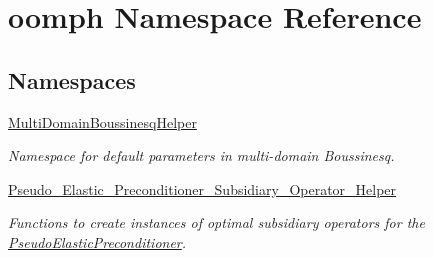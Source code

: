 \hypertarget{namespaceoomph}{}\section{oomph Namespace Reference}
\label{namespaceoomph}
\subsection*{Namespaces}
\begin{DoxyCompactItemize}
\item 
 \hyperlink{namespaceoomph_1_1MultiDomainBoussinesqHelper}{Multi\+Domain\+Boussinesq\+Helper}
\begin{DoxyCompactList}\small\item\em Namespace for default parameters in multi-\/domain Boussinesq. \end{DoxyCompactList}\item 
 \hyperlink{namespaceoomph_1_1Pseudo__Elastic__Preconditioner__Subsidiary__Operator__Helper}{Pseudo\+\_\+\+Elastic\+\_\+\+Preconditioner\+\_\+\+Subsidiary\+\_\+\+Operator\+\_\+\+Helper}
\begin{DoxyCompactList}\small\item\em Functions to create instances of optimal subsidiary operators for the \hyperlink{classoomph_1_1PseudoElasticPreconditioner}{Pseudo\+Elastic\+Preconditioner}. \end{DoxyCompactList}\end{DoxyCompactItemize}
